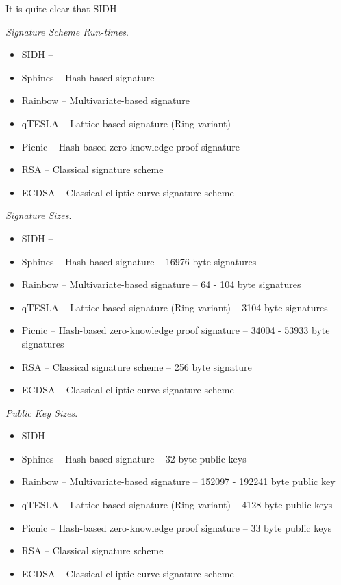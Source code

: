 It is quite clear that SIDH 

\noindent
\textit{Signature Scheme Run-times}.

\begin{itemize}
\item SIDH --
\item Sphincs -- Hash-based signature
\item Rainbow -- Multivariate-based signature
\item qTESLA -- Lattice-based signature (Ring variant)
\item Picnic -- Hash-based zero-knowledge proof signature
\item RSA -- Classical signature scheme
\item ECDSA -- Classical elliptic curve signature scheme
\end{itemize}

\noindent
\textit{Signature Sizes}.

\begin{itemize}
\item SIDH --
\item Sphincs -- Hash-based signature -- 16976 byte signatures
\item Rainbow -- Multivariate-based signature -- 64 - 104 byte signatures
\item qTESLA -- Lattice-based signature (Ring variant) -- 3104 byte signatures
\item Picnic -- Hash-based zero-knowledge proof signature -- 34004 - 53933 byte signatures
\item RSA -- Classical signature scheme -- 256 byte signature
\item ECDSA -- Classical elliptic curve signature scheme
\end{itemize}

\noindent
\textit{Public Key Sizes}.

\begin{itemize}
\item SIDH --
\item Sphincs -- Hash-based signature -- 32 byte public keys
\item Rainbow -- Multivariate-based signature -- 152097 - 192241 byte public key
\item qTESLA -- Lattice-based signature (Ring variant) -- 4128 byte public keys
\item Picnic -- Hash-based zero-knowledge proof signature -- 33 byte public keys
\item RSA -- Classical signature scheme
\item ECDSA -- Classical elliptic curve signature scheme
\end{itemize}

